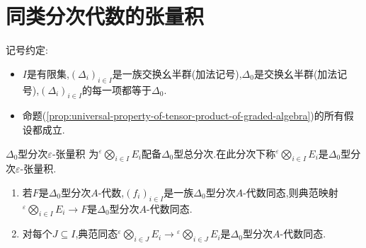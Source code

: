 \section{同类分次代数的张量积}

记号约定:
\begin{itemize}
	\item $I$是有限集,$\left(\Delta_{i}\right)_{i\in I}$是一族交换幺半群(加法记号),$\Delta_{0}$是交换幺半群(加法记号),$\left(\Delta_{i}\right)_{i\in I}$的每一项都等于$\Delta_{0}$.
	\item 命题(\cref{prop:universal-property-of-tensor-product-of-graded-algebra})的所有假设都成立.
\end{itemize}

\begin{definition}{$\Delta_{0}$型分次$\varepsilon$-张量积}{}
	为${}^{\varepsilon}\bigotimes\limits_{i\in I}E_{i}$配备$\Delta_{0}$型总分次.在此分次下称${}^{\varepsilon}\bigotimes\limits_{i\in I}E_{i}$是$\Delta_{0}$型分次$\varepsilon$-张量积.
\end{definition}

\begin{proposition}{}{}
	\begin{enumerate}
		\item 若$F$是$\Delta_{0}$型分次$A$-代数,$\left(f_{i}\right)_{i\in I}$是一族$\Delta_{0}$型分次$A$-代数同态,则典范映射${}^{\varepsilon}\bigotimes\limits_{i\in I}E_{i}\to F$是$\Delta_{0}$型分次$A$-代数同态.
		\item 对每个$J\subseteq I$,典范同态${}^{\varepsilon}\bigotimes\limits_{i\in J}E_{i}\to{}^{\varepsilon}\bigotimes\limits_{i\in J}E_{i}$是$\Delta_{0}$型分次$A$-代数同态.
	\end{enumerate}
\end{proposition}

